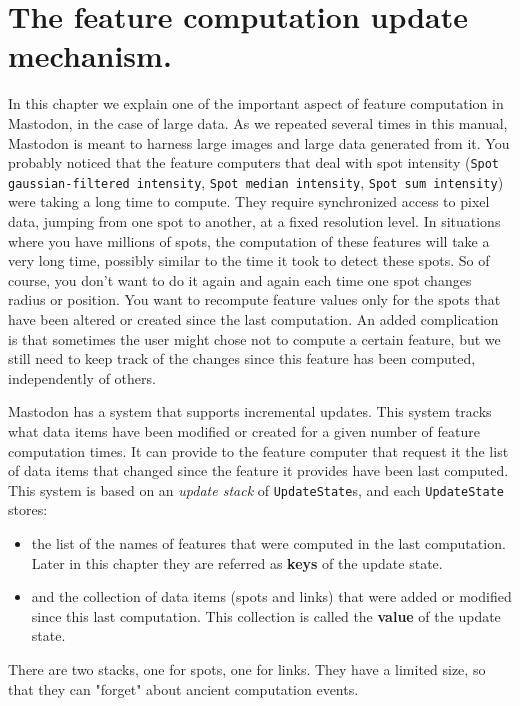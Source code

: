 \section{The feature computation update mechanism.}
\label{sec:FeatureComputationUpdateMechanism}

In this chapter we explain one of the important aspect of feature computation in Mastodon, in the case of large data.
As we repeated several times in this manual, Mastodon is meant to harness large images and large data generated from it. 
You probably noticed that the feature computers that deal with spot intensity (\texttt{Spot gaussian-filtered intensity}, \texttt{Spot median intensity}, \texttt{Spot sum intensity}) were taking a long time to compute. 
They require synchronized access to pixel data, jumping from one spot to another, at a fixed resolution level.
In situations where you have millions of spots, the computation of these features will take a very long time, possibly similar to the time it took to detect these spots. 
So of course, you don't want to do it again and again each time one spot changes radius or position.
You want to recompute feature values only for the spots that have been altered or created since the last computation. 
An added complication is that sometimes the user might chose not to compute a certain feature, but we still need to keep track of the changes since this feature has been computed, independently of others.

Mastodon has a system that supports incremental updates. 
This system tracks what data items have been modified or created for a given number of feature computation times. 
It can provide to the feature computer that request it the list of data items that changed since the feature it provides have been last computed.
This system is based on an \textit{update stack} of \texttt{UpdateState}s, and each \texttt{UpdateState} stores:
\begin{itemize}
    \item the list of the names of features that were computed in the last computation. 
    Later in this chapter they are referred as \textbf{keys} of the update state.
    \item and the collection of data items (spots and links) that were added or modified since this last computation. This collection is called the \textbf{value} of the update state.
\end{itemize}
\noindent There are two stacks, one for spots, one for links.
They have a limited size, so that they can "forget" about ancient computation events. 

